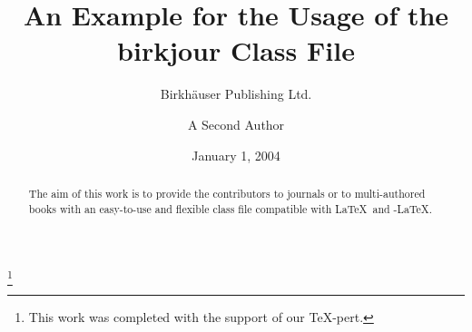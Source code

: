 \documentclass{birkjour}
\theoremstyle{definition}
\theoremstyle{remark}
\numberwithin{equation}{section}
\begin{document}
%
%
%
%
%
%
%
%
%


\title[An Example for birkjour]
 {An Example for the Usage of the\\  birkjour Class File}



\author[Birkh\"auser]{Birkh\"{a}user Publishing Ltd.}

\address{%
Viaduktstr. 42\\
P.O. Box 133\\
CH 4010 Basel\\
Switzerland}


\thanks{This work was completed with the support of our
\TeX-pert.}
\author{A Second Author}
\address{The address of\br
the second author\br
sitting somewhere\br
in the world}


\date{January 1, 2004}

\begin{abstract}
The aim of this work is to provide the contributors to journals or to
multi-authored books with an easy-to-use and flexible class file compatible
with \LaTeX\ and \AmS-\LaTeX.
\end{abstract}

\maketitle
\end{document}

